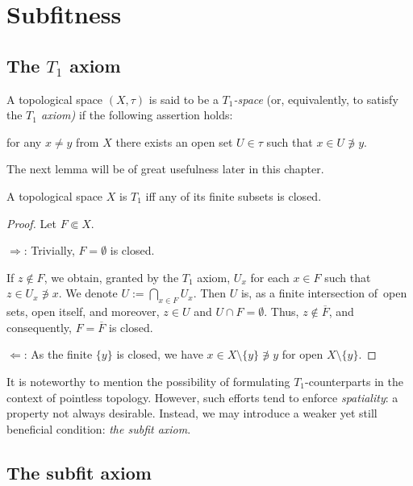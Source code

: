 \chapter{Subfitness}

\section{The $T_1$ axiom}

\begin{df}[$T_1$]
  A topological space $(X, \tau)$ is said to be a {\sl $T_1$-space\/} (or,
  equivalently, to satisfy the {\sl $T_1$ axiom)\/} if the following assertion
  holds:
  \begin{center}
    for any $x \ne y$ from $X$ there exists an open set $U\in \tau$ such that
    $x\in U \not\owns y$.
  \end{center}
\end{df}

The next lemma will be of great usefulness later in this chapter.

\begin{lem} \label{T1Char}
  A topological space $X$ is $T_1$ iff any of its finite subsets is closed.
\end{lem}

\begin{proof}
  Let $F \Subset X$.

  $\Rightarrow$: Trivially, $F = \emptyset$ is closed.
  
  If $z\not\in F$, we obtain, granted by the $T_1$ axiom, $U_x$
  for each $x\in F$ such that $z\in U_x\not\owns x$.
  We denote $U := \bigcap_{x\in F}U_x$.
  Then $U$ is, as a finite intersection of~open sets, open itself, and
  moreover, $z\in U$ and $U \cap F = \emptyset$.
  Thus, $z\not\in \overline{F}$, and consequently, $F = \overline{F}$ is
  closed.

  $\Leftarrow$: As the finite $\{y\}$ is closed, we have $x\in X\setminus
  \{y\} \not\owns y$ for open $X\setminus \{y\}$.
\end{proof}

It is noteworthy to mention the possibility of formulating $T_1$-counterparts
in the context of pointless topology.
However, such efforts tend to enforce {\sl spatiality\/}: a property not always
desirable.
Instead, we may introduce a weaker yet still beneficial condition: {\sl the
subfit axiom\/}.

\section{The subfit axiom}

